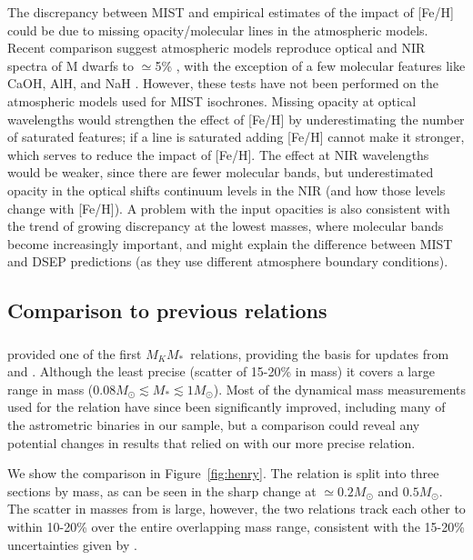 \documentclass[twocolumn]{aastex62}
\newcommand{\mmkc}{$M_{K}$\textendash$M_*$}
\begin{document}
 The discrepancy between MIST and empirical estimates of the impact of [Fe/H] could be due to missing opacity/molecular lines in the atmospheric models. Recent comparison suggest atmospheric models reproduce optical and NIR spectra of M dwarfs to $\simeq$5\% \citep[e.g.,][]{Lepine:2013,Mann2013c}, with the exception of a few molecular features like CaOH, AlH, and NaH \citep{Rajpurohit:2013}. However, these tests have not been performed on the atmospheric models used for MIST isochrones. Missing opacity at optical wavelengths would strengthen the effect of [Fe/H] by underestimating the number of saturated features; if a line is saturated adding [Fe/H] cannot make it stronger, which serves to reduce the impact of [Fe/H]. The effect at NIR wavelengths would be weaker, since there are fewer molecular bands, but underestimated opacity in the optical shifts continuum levels in the NIR (and how those levels change with [Fe/H]). A problem with the input opacities is also consistent with the trend of growing discrepancy at the lowest masses, where molecular bands become increasingly important, and might explain the difference between MIST and DSEP predictions (as they use different atmosphere boundary conditions). 
 

\subsection{Comparison to previous relations}\label{sec:other}

\subsubsection{\citet{Hen1993}}

\citet{Hen1993} provided one of the first \mmkc\ relations, providing the basis for updates from \citet{Delfosse2000} and \citet{Benedict2016}. Although the least precise (scatter of 15-20\% in mass) it covers a large range in mass ($0.08M_\odot \lesssim M_* \lesssim 1M_\odot$). Most of the dynamical mass measurements used for the \citet{Hen1993} relation have since been significantly improved, including many of the astrometric binaries in our sample, but a comparison could reveal any potential changes in results that relied on \citet{Hen1993} with our more precise relation.

We show the comparison in Figure~\ref{fig:henry}. The \citet{Hen1993} relation is split into three sections by mass, as can be seen in the sharp change at $\simeq0.2M_\odot$ and $0.5M_\odot$. The scatter in masses from \citet{Hen1993} is large, however, the two relations track each other to within 10-20\% over the entire overlapping mass range, consistent with the 15-20\% uncertainties given by \citet{Hen1993}.
\end{document}

